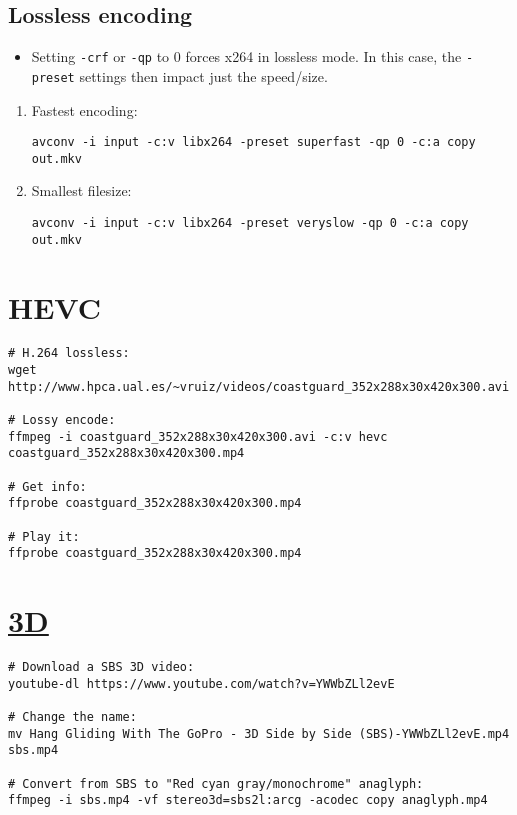 
\subsection{Lossless encoding}

\begin{itemize}

\item Setting \texttt{-crf} or \texttt{-qp} to 0 forces x264 in
  lossless mode. In this case, the \texttt{-preset} settings then
  impact just the speed/size.

\end{itemize}

\begin{enumerate}
\item Fastest encoding:
\begin{verbatim}
avconv -i input -c:v libx264 -preset superfast -qp 0 -c:a copy out.mkv
\end{verbatim}

\item Smallest filesize:
\begin{verbatim}
avconv -i input -c:v libx264 -preset veryslow -qp 0 -c:a copy out.mkv
\end{verbatim}
\end{enumerate}



\section{HEVC}
\begin{verbatim}
# H.264 lossless:
wget http://www.hpca.ual.es/~vruiz/videos/coastguard_352x288x30x420x300.avi

# Lossy encode:
ffmpeg -i coastguard_352x288x30x420x300.avi -c:v hevc coastguard_352x288x30x420x300.mp4

# Get info:
ffprobe coastguard_352x288x30x420x300.mp4

# Play it:
ffprobe coastguard_352x288x30x420x300.mp4
\end{verbatim}

\section{\href{https://trac.ffmpeg.org/wiki/Stereoscopic}{3D}}

\begin{verbatim}
# Download a SBS 3D video:
youtube-dl https://www.youtube.com/watch?v=YWWbZLl2evE

# Change the name:
mv Hang Gliding With The GoPro - 3D Side by Side (SBS)-YWWbZLl2evE.mp4 sbs.mp4

# Convert from SBS to "Red cyan gray/monochrome" anaglyph:
ffmpeg -i sbs.mp4 -vf stereo3d=sbs2l:arcg -acodec copy anaglyph.mp4
\end{verbatim}


